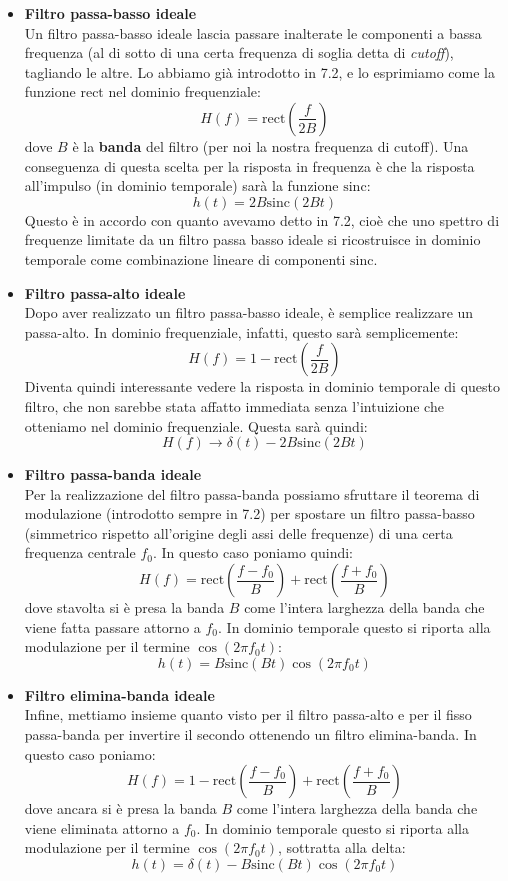 \documentclass[a4paper,11pt]{article}
\begin{document}
\begin{itemize}
\item \textbf{\textsf{Filtro passa-basso ideale}} \\
Un filtro passa-basso ideale lascia passare inalterate le componenti a bassa frequenza (al di sotto di una certa frequenza di soglia detta di \textit{cutoff}), tagliando le altre. Lo abbiamo già introdotto in 7.2, e lo esprimiamo come la funzione $\mathrm{rect}$ nel dominio frequenziale:
$$
H(f) = \mathrm{rect} \left( \frac{f}{2B} \right)
$$
dove $B$ è la \textbf{banda} del filtro (per noi la nostra frequenza di cutoff).
Una conseguenza di questa scelta per la risposta in frequenza è che la risposta all'impulso (in dominio temporale) sarà la funzione $\mathrm{sinc}$:
$$
h(t) = 2 B \mathrm{sinc}(2B t)
$$
Questo è in accordo con quanto avevamo detto in 7.2, cioè che uno spettro di frequenze limitate da un filtro passa basso ideale si ricostruisce in dominio temporale come combinazione lineare di componenti $\mathrm{sinc}$.

\item \textbf{\textsf{Filtro passa-alto ideale}} \\
Dopo aver realizzato un filtro passa-basso ideale, è semplice realizzare un passa-alto. In dominio frequenziale, infatti, questo sarà semplicemente:
$$
H(f) = 1 - \mathrm{rect} \left( \frac{f}{2B} \right)
$$
Diventa quindi interessante vedere la risposta in dominio temporale di questo filtro, che non sarebbe stata affatto immediata senza l'intuizione che otteniamo nel dominio frequenziale. Questa sarà quindi:
$$
H(f) \rightarrow \delta(t) - 2 B \mathrm{sinc}(2B t)
$$

\item \textbf{\textsf{Filtro passa-banda ideale}} \\
Per la realizzazione del filtro passa-banda possiamo sfruttare il teorema di modulazione (introdotto sempre in 7.2) per spostare un filtro passa-basso (simmetrico rispetto all'origine degli assi delle frequenze) di una certa frequenza centrale $f_0$. In questo caso poniamo quindi:
$$
H(f) = \mathrm{rect} \left( \frac{f - f_0}{B} \right) + \mathrm{rect} \left( \frac{f + f_0}{B} \right)
$$
dove stavolta si è presa la banda $B$ come l'intera larghezza della banda che viene fatta passare attorno a $f_0$.
In dominio temporale questo si riporta alla modulazione per il termine $\cos (2 \pi f_0 t)$:
$$
h(t) = B \mathrm{sinc} (Bt) \cos(2 \pi f_0 t)
$$
\item \textbf{\textsf{Filtro elimina-banda ideale}} \\
Infine, mettiamo insieme quanto visto per il filtro passa-alto e per il fisso passa-banda per invertire il secondo ottenendo un filtro elimina-banda. In questo caso poniamo:
$$
H(f) = 1 - \mathrm{rect} \left( \frac{f - f_0}{B} \right) + \mathrm{rect} \left( \frac{f + f_0}{B} \right)
$$
dove ancara si è presa la banda $B$ come l'intera larghezza della banda che viene eliminata attorno a $f_0$.
In dominio temporale questo si riporta alla modulazione per il termine $\cos (2 \pi f_0 t)$, sottratta alla delta:
$$
h(t) = \delta(t) - B \mathrm{sinc} (Bt) \cos(2 \pi f_0 t)
$$
\end{itemize}
\end{document}
